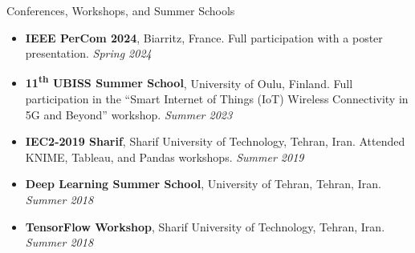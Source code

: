 \documentclass{resume}
\begin{document}
\begin{rSection}{Conferences, Workshops, and Summer Schools}
\begin{itemize}
    \item {\bf IEEE PerCom 2024}, Biarritz, France. Full participation with a poster presentation. {\em Spring 2024}

    \item {\bf 11\textsuperscript{th} UBISS Summer School}, University of Oulu, Finland. Full participation in the ``Smart Internet of Things (IoT) Wireless Connectivity in 5G and Beyond'' workshop. {\em Summer 2023}

    \item {\bf IEC2-2019 Sharif}, Sharif University of Technology, Tehran, Iran. Attended KNIME, Tableau, and Pandas workshops. {\em Summer 2019}

    \item {\bf Deep Learning Summer School}, University of Tehran, Tehran, Iran. {\em Summer 2018}

    \item {\bf TensorFlow Workshop}, Sharif University of Technology, Tehran, Iran. {\em Summer 2018}

\end{itemize}

\end{rSection}

\end{document}
